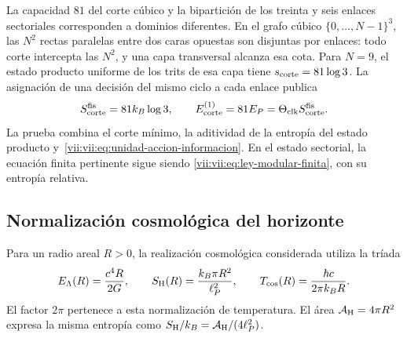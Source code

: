 La capacidad \(81\) del corte cúbico y la bipartición de los treinta y
seis enlaces sectoriales corresponden a dominios diferentes. En el
grafo cúbico \(\{0,\ldots,N-1\}^3\), las \(N^2\) rectas
paralelas entre dos caras opuestas son disjuntas por enlaces: todo corte
intercepta las \(N^2\), y una capa transversal alcanza esa cota.
Para \(N=9\), el estado producto uniforme de los trits de esa capa
tiene \(s_{\rm corte}=81\log3\). La asignación de una decisión del
mismo ciclo a cada enlace publica
\begin{equation}
 S_{\rm corte}^{\rm fis}=81k_B\log3,\qquad
 E_{\rm corte}^{(1)}=81E_P
                  =\Theta_{\rm clk}S_{\rm corte}^{\rm fis}.
 \label{vii:vii:eq:corte-energia-informacion}
\end{equation}
La prueba combina el corte mínimo, la aditividad de la entropía del
estado producto y~\eqref{vii:vii:eq:unidad-accion-informacion}. En el estado
sectorial, la ecuación finita pertinente sigue siendo
\eqref{vii:vii:eq:ley-modular-finita}, con su entropía relativa.

\subsection{Normalización cosmológica del horizonte}
\label{vii:vii:subsec:balance-horizonte}

Para un radio areal \(R>0\), la realización cosmológica considerada
utiliza la tríada
\begin{equation}
 E_\Lambda(R)=\frac{c^4R}{2G},\qquad
 S_{\rm H}(R)=\frac{k_B\pi R^2}{\ell_P^2},\qquad
 T_{\rm cos}(R)=\frac{\hbar c}{2\pi k_BR}.
 \label{vii:vii:eq:horizonte-cosmologico}
\end{equation}
El factor \(2\pi\) pertenece a esta normalización de temperatura.
El área \(\mathcal A_{\rm H}=4\pi R^2\) expresa la misma entropía
como \(S_{\rm H}/k_B=\mathcal A_{\rm H}/(4\ell_P^2)\).

